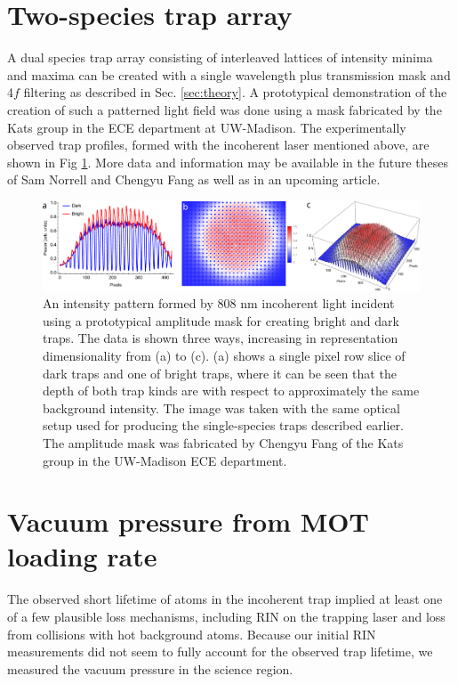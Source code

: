 \section{Two-species trap array}


A dual species trap array consisting of interleaved lattices of intensity minima and maxima can be created with a single wavelength plus transmission mask and 4$f$ filtering as described in Sec. \ref{sec:theory}. A prototypical demonstration of the creation of such a patterned light field was done using a mask fabricated by the Kats group in the ECE department at UW-Madison. The experimentally observed trap profiles, formed with the incoherent laser mentioned above, are shown in Fig \ref{fig:dual_species_traps}. More data and information may be available in the future theses of Sam Norrell and Chengyu Fang as well as in an upcoming article\cite{fang2024interspersed}.

\begin{figure}
    \centering
    \includegraphics[width=\textwidth]{Images/first_dual_species_trap_image.pdf}
    \caption{An intensity pattern formed by 808 nm incoherent light incident using a prototypical amplitude mask for creating bright and dark traps. The data is shown three ways, increasing in representation dimensionality from (a) to (c). (a) shows a single pixel row slice of dark traps and one of bright traps, where it can be seen that the depth of both trap kinds are with respect to approximately the same background intensity. The image was taken with the same optical setup used for producing the single-species traps described earlier. The amplitude mask was fabricated by Chengyu Fang of the Kats group in the UW-Madison ECE department.}
    \label{fig:dual_species_traps}
\end{figure}

\section{Vacuum pressure from MOT loading rate}

The observed short lifetime of atoms in the incoherent trap implied at least one of a few plausible loss mechanisms, including RIN on the trapping laser and loss from collisions with hot background atoms. Because our initial RIN measurements did not seem to fully account for the observed trap lifetime, we measured the vacuum pressure in the science region. 

